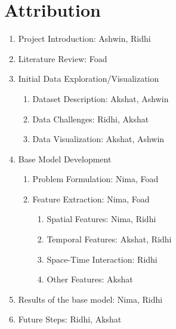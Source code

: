 \documentclass[11pt]{article}
\begin{document}
\section{Attribution}
\begin{enumerate}[label*=\arabic*.]
    \item Project Introduction: Ashwin, Ridhi
    \item Literature Review: Foad
    \item Initial Data Exploration/Visualization
    \begin{enumerate}[label*=\arabic*.]
        \item Dataset Description: Akshat, Ashwin
        \item Data Challenges: Ridhi, Akshat
        \item Data Visualization: Akshat, Ashwin
    \end{enumerate}
    \item Base Model Development
    \begin{enumerate}[label*=\arabic*.]
        \item Problem Formulation: Nima, Foad
        \item Feature Extraction: Nima, Foad
        \begin{enumerate}[label*=\arabic*.]
            \item Spatial Features: Nima, Ridhi
            \item Temporal Features: Akshat, Ridhi
            \item Space-Time Interaction: Ridhi
            \item Other Features: Akshat
        \end{enumerate}
    \end{enumerate}
    \item Results of the base model: Nima, Ridhi
    \item Future Steps: Ridhi, Akshat
\end{enumerate}

\end{document}
